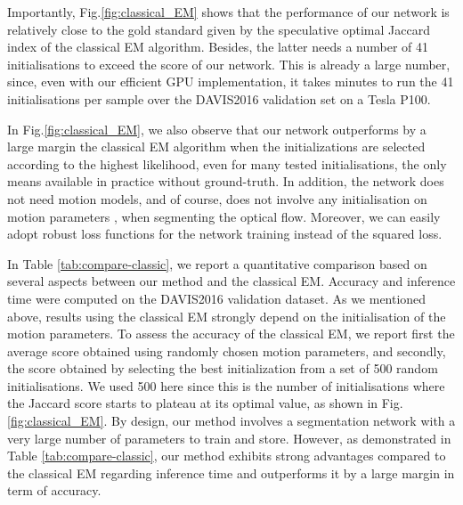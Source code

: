 \documentclass[10pt,twocolumn,letterpaper]{article}
\begin{document}
Importantly, Fig.\ref{fig:classical_EM} shows that the performance of our network is relatively close to the gold standard given by the speculative optimal Jaccard index of the classical EM algorithm. Besides, the latter needs a number of 41 initialisations to exceed the score of our network. This is already a large number, since, even with our efficient GPU implementation, it takes  minutes to run the 41 initialisations per sample over the DAVIS2016 validation set on a Tesla P100.


In Fig.\ref{fig:classical_EM}, we also observe that our network outperforms by a large margin the classical EM algorithm when the initializations are selected according to the highest likelihood, even for many tested initialisations, the only means available in practice without ground-truth. In addition, the network does not need motion models, and of course, does not involve any initialisation on motion parameters , when segmenting the optical flow.
Moreover, we can easily adopt robust loss functions for the network training instead of the squared  loss.

In Table \ref{tab:compare-classic}, we report a quantitative comparison based on several aspects between our method and the classical EM. Accuracy and inference time were computed on the DAVIS2016 validation dataset. As we mentioned above, results using the classical EM strongly depend on the initialisation of the motion parameters. To assess the accuracy of the classical EM, we report first the average score obtained using randomly chosen motion parameters, and secondly, the score obtained by selecting the best initialization from a set of 500 random initialisations. We used 500 here since this is the number of initialisations where the Jaccard score starts to plateau at its optimal value, as shown in Fig.\ref{fig:classical_EM}. By design, our method involves a segmentation network with a very large number of parameters to train and store. However, as demonstrated in Table \ref{tab:compare-classic}, our method exhibits strong advantages compared to the classical EM regarding inference time and outperforms it by a large margin in term of accuracy.
\end{document}
